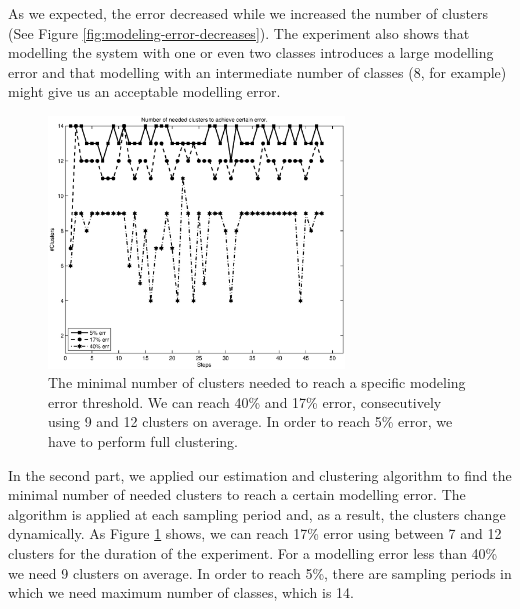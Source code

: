  As we expected, the error decreased while we increased the number of clusters (See Figure \ref{fig:modeling-error-decreases}). The experiment also shows that modelling the system with one or even two classes introduces a large modelling error and that modelling with an intermediate number of classes (8, for example) might give us an acceptable modelling error. 
\begin{figure}[htbp]
	\centering
	\includegraphics[width=0.7\textwidth]{image/cluster_num_by_error.eps} 
	\caption[ The minimum number of clusters, dynamically adjusted, to reach a certain modeling error.]{The minimal number of clusters needed to reach a specific modeling error threshold.  We can reach 40\% and 17\% error, consecutively using 9 and 12 clusters on average. In order to reach 5\% error, we have to perform full clustering.}
	\label{fig:minimal-number-needed-clusters}      
\end{figure}

In the second part, we applied our estimation and clustering algorithm to find the minimal number of needed clusters to reach a certain modelling error. The algorithm is applied at each sampling period and, as a result, the clusters change dynamically. As Figure \ref{fig:minimal-number-needed-clusters} shows, we can reach 17\% error using between 7 and 12 clusters for the duration of the experiment. For a modelling error less than 40\% we need 9 clusters on average. In order to reach 5\%, there are sampling periods in which we need maximum number of classes, which is 14.

